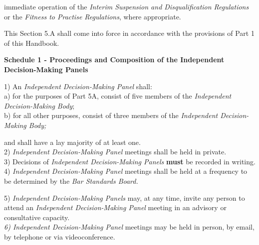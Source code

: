 immediate operation of the \emph{Interim Suspension and Disqualification
Regulations} or the \emph{Fitness to Practise Regulations}, where
appropriate.\\
\par
{}
This Section 5.A shall come into force in accordance with the provisions
of Part 1 of this Handbook.\\
\par
{} 
\textbf{Schedule 1 - Proceedings and Composition of the Independent
Decision-Making Panels }\par
1) An \emph{Independent Decision-Making Panel} shall:\\
a) for the purposes of Part 5A, consist of five members of
the \emph{Independent Decision-Making Body};\\
b) for all other purposes, consist of three members of
the \emph{Independent Decision-Making Body;}\par
and shall have a lay majority of at least one.\\
2) \emph{Independent Decision-Making Panel} meetings shall be held in
private.\\
3) Decisions of \emph{Independent Decision-Making Panels}  \textcolor{myred}{\textbf{must}} be
recorded in writing.\\
4) \emph{Independent Decision-Making Panel} meetings shall be held at a
frequency to be determined by the \emph{Bar Standards Board.}\par
5) \emph{Independent Decision-Making Panels} may, at any time, invite
any person to attend an \emph{Independent Decision-Making Panel} meeting
in an advisory or consultative capacity.\\
\emph{6) Independent Decision-Making Panel }meetings may be held in
person, by email, by telephone or via videoconference.\\

\par

